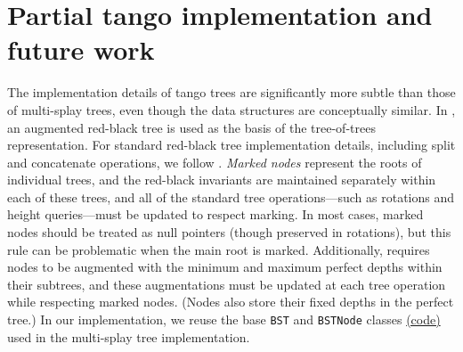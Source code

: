\documentclass{article}
\begin{document}



\section{Partial tango implementation and future work}
The implementation details of tango trees are significantly more subtle than those of multi-splay trees, even though the data structures are conceptually similar. In \cite{demaine2007dynamic}, an augmented red-black tree is used as the basis of the tree-of-trees representation. For standard red-black tree implementation details, including split and concatenate operations, we follow \cite{tarjan1983data, sedgewick1990algorithms, cormen2009introduction, wein2005efficient, wiki:rb}. \emph{Marked nodes} represent the roots of individual trees, and the red-black invariants are maintained separately within each of these trees, and all of the standard tree operations---such as rotations and height queries---must be updated to respect marking. In most cases, marked nodes should be treated as null pointers (though preserved in rotations), but this rule can be problematic when the main root is marked. Additionally, \cite{demaine2007dynamic} requires nodes to be augmented with the minimum and maximum perfect depths within their subtrees, and these augmentations must be updated at each tree operation while respecting marked nodes. (Nodes also store their fixed depths in the perfect tree.) In our implementation, we reuse the base \texttt{BST} and \texttt{BSTNode} classes \href{https://github.com/6851-2021/tango-trees/blob/master/src/bst.hpp}{(code)} used in the multi-splay tree implementation.
\end{document}
